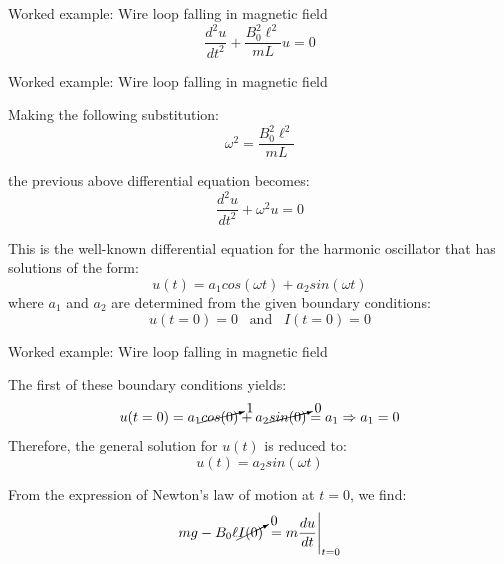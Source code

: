 {\begin{frame}{Worked example: Wire loop falling in magnetic field}
  \begin{equation*}
    \frac{d^2 u}{dt^2} + \frac{B_0^2 \ell^2}{mL} u = 0
  \end{equation*}

\end{frame}

%
%
%

\begin{frame}{Worked example: Wire loop falling in magnetic field}

  Making the following substitution:
  \begin{equation*}
    \omega^2 = \frac{B_0^2 \ell^2}{mL}
  \end{equation*}

  the previous above differential equation becomes:
  \begin{equation*}
    \frac{d^2 u}{dt^2} + \omega^2 u = 0
  \end{equation*}

  This is the well-known differential equation for the harmonic oscillator
  that has solutions of the form:
  \begin{equation*}
    u(t) = a_1 cos(\omega t) + a_2 sin(\omega t)
  \end{equation*}
  where $a_1$ and $a_2$ are determined from the given
  boundary conditions:
  \begin{equation*}
    u(t=0) = 0 \;\;\; \text{and} \;\;\; I(t=0) = 0
  \end{equation*}

\end{frame}

%
%
%

\begin{frame}{Worked example: Wire loop falling in magnetic field}

  The first of these boundary conditions yields:
  \begin{equation*}
    u(t=0) = a_1 \cancelto{1}{cos(0)} + a_2 \cancelto{0}{sin(0)} = a_1
    \Rightarrow
    a_1 = 0
  \end{equation*}
  Therefore, the general solution for $u(t)$ is reduced to:
  \begin{equation*}
    u(t) = a_2 sin(\omega t)
    \label{eq:p3d_ut_bc1}
  \end{equation*}

  From the expression of Newton's law of motion at $t=0$, we find:
  \begin{equation*}
    mg - B_0 \ell \cancelto{0}{I(0)} \; =
       m \frac{du}{dt} \Bigg\rvert_{t=0}
  \end{equation*}


\end{frame}}
